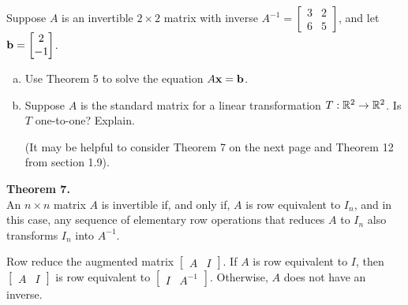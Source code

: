 \begin{exercise} %
	Suppose $A$ is an invertible $2\times 2$ matrix with inverse $A^{-1}=\begin{bmatrix}3&2\\6&5\end{bmatrix}$, and let $\boldsymbol{\mathbf{b}}=\begin{bmatrix}2\\-1\end{bmatrix}$.
	\begin{enumerate}[(a)]
		\item Use Theorem 5 to solve the equation $A\boldsymbol{\mathbf{x}}=\boldsymbol{\mathbf{b}}$.
		\vfill
		\item Suppose $A$ is the standard matrix for a linear transformation $T:\mathbb{R}^{2}\to\mathbb{R}^{2}$. Is $T$ one-to-one? Explain. \par
		(It may be helpful to consider Theorem 7 on the next page and Theorem 12 from section 1.9).
		\vspace{2em}
	\end{enumerate}
\end{exercise}


\newpage


\begin{boxthm}
	\textbf{Theorem 7.} \\
	An $n\times n$ matrix $A$ is invertible if, and only if, $A$ is row equivalent to $I_n$, and in this case, any sequence of elementary row operations that reduces $A$ to $I_n$ also transforms $I_n$ into $A^{-1}$.
\end{boxthm}
\begin{boxdef}
	Row reduce the augmented matrix $\begin{bmatrix}A&I\end{bmatrix}$. If $A$ is row equivalent to $I$, then $\begin{bmatrix}A&I\end{bmatrix}$ is row equivalent to $\begin{bmatrix}I&A^{-1}\end{bmatrix}$. Otherwise, $A$ does not have an inverse.
\end{boxdef}


